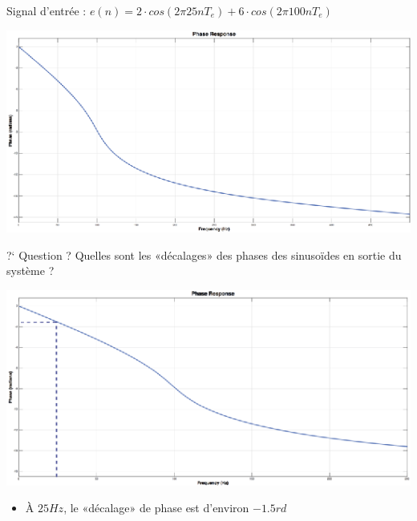 \documentclass[a4paper,11pt]{beamer}
\begin{document}
\begin{frame}
\centering
Signal d'entrée : $e(n) = 2\cdot cos(2\pi 25 nT_e) + 6\cdot cos(2\pi 100 nT_e)$
\vspace{0.25cm}

\includegraphics[scale=1.5]{images/PhaseFilter1_BIS.eps}

\begin{exampleblock}{?`  Question ?}
\centering
Quelles sont les «décalages» des phases des sinusoïdes en sortie du système ?
\end{exampleblock}

\end{frame}

\begin{frame}
\centering
\includegraphics[scale=1.5]{images/PhaseFilter2_BIS.eps}
\begin{itemize}[label=$\bullet$]
  \item À $25Hz$, le «décalage» de phase est d'environ $-1.5rd$
\end{itemize}
\end{frame}
\end{document}
